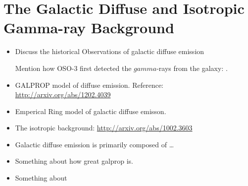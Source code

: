 \section{The Galactic Diffuse and Isotropic Gamma-ray Background}


\begin{itemize}
  \item Discuss the historical Observations of galactic diffuse emission

    Mention how \gls{OSO-3} first detected the $gamma$-rays from the galaxy: .


  \item GALPROP model of diffuse emission.
  Reference: \url{http://arxiv.org/abs/1202.4039}
  \item Emperical Ring model of galactic diffuse emisson.
  \item The isotropic background: \url{http://arxiv.org/abs/1002.3603}
\end{itemize}

\begin{itemize}
  \item Galactic diffuse emission is primarily composed of \ldots
  \item Something about how great galprop is.
  \item Something about
\end{itemize}


